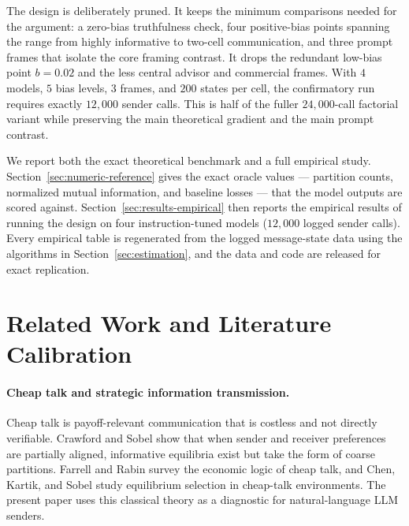 \documentclass[11pt]{article}
\begin{document}
The design is deliberately pruned.  It keeps the minimum comparisons needed for the argument: a zero-bias truthfulness check, four positive-bias points spanning the range from highly informative to two-cell communication, and three prompt frames that isolate the core framing contrast.  It drops the redundant low-bias point $b=0.02$ and the less central advisor and commercial frames.  With $4$ models, $5$ bias levels, $3$ frames, and $200$ states per cell, the confirmatory run requires exactly $12{,}000$ sender calls.  This is half of the fuller $24{,}000$-call factorial variant while preserving the main theoretical gradient and the main prompt contrast.

We report both the exact theoretical benchmark and a full empirical study.  Section~\ref{sec:numeric-reference} gives the exact oracle values --- partition counts, normalized mutual information, and baseline losses --- that the model outputs are scored against.  Section~\ref{sec:results-empirical} then reports the empirical results of running the design on four instruction-tuned models ($12{,}000$ logged sender calls).  Every empirical table is regenerated from the logged message-state data using the algorithms in Section~\ref{sec:estimation}, and the data and code are released for exact replication.

\section{Related Work and Literature Calibration}

\paragraph{Cheap talk and strategic information transmission.}
Cheap talk is payoff-relevant communication that is costless and not directly verifiable.  Crawford and Sobel \cite{crawford1982} show that when sender and receiver preferences are partially aligned, informative equilibria exist but take the form of coarse partitions.  Farrell and Rabin \cite{farrell1996} survey the economic logic of cheap talk, and Chen, Kartik, and Sobel \cite{chen2008} study equilibrium selection in cheap-talk environments.  The present paper uses this classical theory as a diagnostic for natural-language LLM senders.
\end{document}
